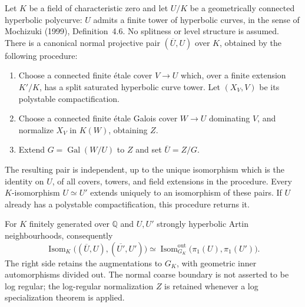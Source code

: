 \begin{theorem}
\label{A:polycurve-coarse-compactification}
Let $K$ be a field of characteristic zero and let $U/K$ be a
geometrically connected hyperbolic polycurve: $U$ admits a finite
tower of hyperbolic curves, in the sense of Mochizuki (1999),
Definition~4.6. No splitness or level structure is assumed.
There is a canonical normal projective pair $(\overline U,U)$
over $K$, obtained by the following procedure:
\begin{enumerate}
\item Choose a connected finite \'etale cover $V\to U$ which,
over a finite extension $K'/K$, has a split saturated hyperbolic
curve tower. Let $(X_V,V)$ be its polystable compactification.
\item Choose a connected finite \'etale Galois cover $W\to U$
dominating $V$, and normalize $X_V$ in $K(W)$, obtaining $Z$.
\item Extend $G=\operatorname{Gal}(W/U)$ to $Z$ and set
$\overline U=Z/G$.
\end{enumerate}
The resulting pair is independent, up to the unique isomorphism
which is the identity on $U$, of all covers, towers, and field
extensions in the procedure. Every $K$-isomorphism $U\simeq U'$
extends uniquely to an isomorphism of these pairs. If $U$ already
has a polystable compactification, this procedure returns it.

For $K$ finitely generated over $\mathbb Q$ and $U,U'$ strongly
hyperbolic Artin neighbourhoods, consequently
\[
 \operatorname{Isom}_K\bigl((\overline U,U),(\overline {U'},U')\bigr)
 \simeq
 \operatorname{Isom}^{\mathrm{out}}_{G_K}
       \bigl(\pi_1(U),\pi_1(U')\bigr).
\]
The right side retains the augmentations to $G_K$, with geometric
inner automorphisms divided out. The normal coarse boundary is not
asserted to be log regular; the log-regular normalization $Z$ is
retained whenever a log specialization theorem is applied.
\end{theorem}

